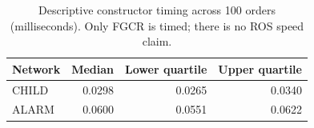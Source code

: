 \begin{table}[tbp]\centering
\caption{Descriptive constructor timing across 100 orders (milliseconds). Only FGCR is timed; there is no ROS speed claim.}\label{tab:new-time}
\begin{tabular}{lrrr}
\toprule
Network & Median & Lower quartile & Upper quartile\\
\midrule
CHILD & 0.0298 & 0.0265 & 0.0340\\
ALARM & 0.0600 & 0.0551 & 0.0622\\
\bottomrule\end{tabular}\end{table}
